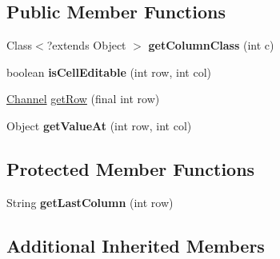 \subsection*{Public Member Functions}
\begin{DoxyCompactItemize}
\item 
\hypertarget{classgov_1_1fnal_1_1ppd_1_1dd_1_1channel_1_1list_1_1table_1_1ChannelChooserTableModel_aee82669d923468d8771f356e6c79be92}{Class$<$?extends Object $>$ {\bfseries get\-Column\-Class} (int c)}\label{classgov_1_1fnal_1_1ppd_1_1dd_1_1channel_1_1list_1_1table_1_1ChannelChooserTableModel_aee82669d923468d8771f356e6c79be92}

\item 
\hypertarget{classgov_1_1fnal_1_1ppd_1_1dd_1_1channel_1_1list_1_1table_1_1ChannelChooserTableModel_ab91b1da702ee05933622a6aad3439424}{boolean {\bfseries is\-Cell\-Editable} (int row, int col)}\label{classgov_1_1fnal_1_1ppd_1_1dd_1_1channel_1_1list_1_1table_1_1ChannelChooserTableModel_ab91b1da702ee05933622a6aad3439424}

\item 
\hyperlink{interfacegov_1_1fnal_1_1ppd_1_1dd_1_1signage_1_1Channel}{Channel} \hyperlink{classgov_1_1fnal_1_1ppd_1_1dd_1_1channel_1_1list_1_1table_1_1ChannelChooserTableModel_a60f6f27e6f106dcbbdc21bece4b2f6bf}{get\-Row} (final int row)
\item 
\hypertarget{classgov_1_1fnal_1_1ppd_1_1dd_1_1channel_1_1list_1_1table_1_1ChannelChooserTableModel_adcb62fe264622dd9718a3587622a064f}{Object {\bfseries get\-Value\-At} (int row, int col)}\label{classgov_1_1fnal_1_1ppd_1_1dd_1_1channel_1_1list_1_1table_1_1ChannelChooserTableModel_adcb62fe264622dd9718a3587622a064f}

\end{DoxyCompactItemize}
\subsection*{Protected Member Functions}
\begin{DoxyCompactItemize}
\item 
\hypertarget{classgov_1_1fnal_1_1ppd_1_1dd_1_1channel_1_1list_1_1table_1_1ChannelChooserTableModel_a9fccc9a5ede30fb16e03f699085a4d90}{String {\bfseries get\-Last\-Column} (int row)}\label{classgov_1_1fnal_1_1ppd_1_1dd_1_1channel_1_1list_1_1table_1_1ChannelChooserTableModel_a9fccc9a5ede30fb16e03f699085a4d90}

\end{DoxyCompactItemize}
\subsection*{Additional Inherited Members}


